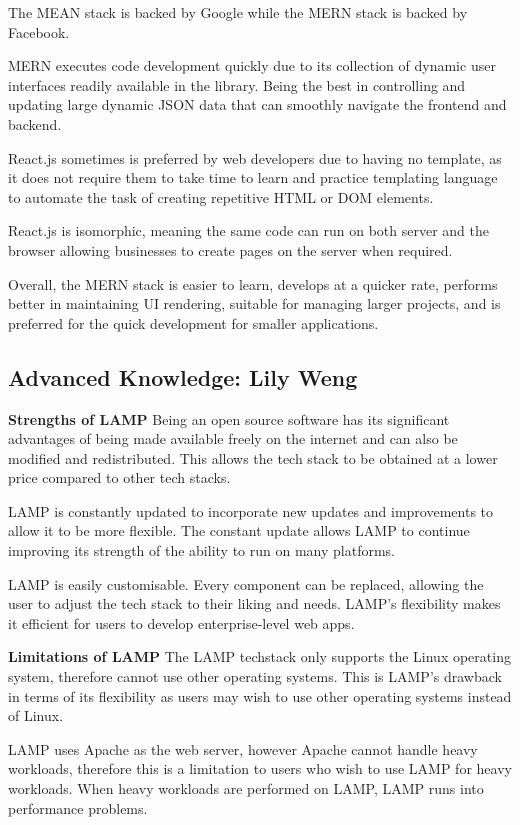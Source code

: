 \documentclass[a4paper, 11pt]{report}
\begin{document}
The MEAN stack is backed by Google while the MERN stack is backed by Facebook.

MERN executes code development quickly due to its collection of dynamic user interfaces readily available in the library. Being the best in controlling and updating large dynamic JSON data that can smoothly navigate the frontend and backend. \cite{ali14}

React.js sometimes is preferred by web developers due to having no template, as it does not require them to take time to learn and practice templating language to automate the task of creating repetitive HTML or DOM elements. \cite{ali15}

React.js is isomorphic, meaning the same code can run on both server and the browser allowing businesses to create pages on the server when required.

Overall, the MERN stack is easier to learn, develops at a quicker rate, performs better in maintaining UI rendering, suitable for managing larger projects, and is preferred for the quick development for smaller applications. \cite{ali13}


\subsection{Advanced Knowledge: Lily Weng}

\textbf{Strengths of LAMP}
Being an open source software has its significant advantages of being made available freely on the internet and can also be modified and redistributed. This allows the tech stack to be obtained at a lower price compared to other tech stacks.

LAMP is constantly updated to incorporate new updates and improvements to allow it to be more flexible. The constant update allows LAMP to continue improving its strength of the ability to run on many platforms.

LAMP is easily customisable. Every component can be replaced, allowing the user to adjust the tech stack to their liking and needs. LAMP’s flexibility makes it efficient for users to develop enterprise-level web apps.

\textbf{Limitations of LAMP}
The LAMP techstack only supports the Linux operating system, therefore cannot use other operating systems. This is LAMP’s drawback in terms of its flexibility as users may wish to use other operating systems instead of Linux.

LAMP uses Apache as the web server, however Apache cannot handle heavy workloads, therefore this is a limitation to users who wish to use LAMP for heavy workloads. When heavy workloads are performed on LAMP, LAMP runs into performance problems.
\end{document}
